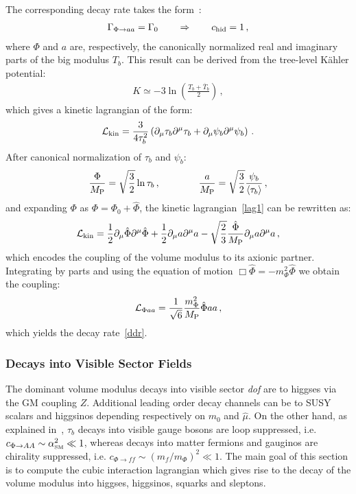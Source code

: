 \documentclass[12pt,a4paper]{book}
\def\SM{{\scriptscriptstyle \rm SM}}
\newcommand{\mc}{\mathcal}
\begin{document}
The corresponding decay rate takes the form~\cite{Cicoli:2012aq,Higaki:2012ar}: 
\begin{align}
\Gamma_{\Phi \rightarrow a a} = \Gamma_0\qquad\Rightarrow\qquad c_{\rm hid}=1\,,
\label{ddr}
\end{align}
where $\Phi$ and $a$ are, respectively, the canonically normalized real and imaginary parts of the big modulus $T_b$.
This result can be derived from the tree-level K\"ahler potential:
\begin{align}
K \simeq - 3 \ln\left(\frac{T_b+\overline{T}_b}{2}\right)\,,
\end{align}
which gives a kinetic lagrangian of the form:
\begin{align}
\mc{L}_{\rm kin} = \frac{3}{4 \tau_b^2} \left(\partial_\mu \tau_b \partial^\mu \tau_b + \partial_\mu \psi_b \partial^\mu \psi_b\right)\,.
\label{lag1}
\end{align}
After canonical normalization of $\tau_b$ and $\psi_b$:
\begin{align}
\label{cn1}
\frac{\Phi}{M_{\rm P}} = \sqrt{\frac{3}{2}} \ln \tau_b\,, \qquad \qquad \frac{a}{M_{\rm P}} = \sqrt{\frac{3}{2}} \frac{\psi_b}{\langle \tau_b \rangle}\,,
\end{align}
and expanding $\Phi$ as $\Phi = \Phi_0 + \hat \Phi$, the kinetic lagrangian~\eqref{lag1} can be rewritten as:
\begin{align}
\mc{L}_{\rm kin} = \frac 12 \partial_\mu \hat\Phi \partial^\mu \hat\Phi + \frac 12 \partial_\mu a \partial^\mu a - \sqrt{\frac 23 } \frac{\hat \Phi}{M_{\rm P}} \partial_\mu a \partial^\mu a\,,
\end{align}
which encodes the coupling of the volume modulus to its axionic partner. Integrating by parts and using the equation of motion 
$\Box \hat \Phi = - m_\Phi^2 \hat \Phi$ we obtain the coupling:
\begin{align}
\mathcal{L}_{\Phi a a} = \frac{1}{\sqrt{6}}\frac{m_\Phi^2}{M_{\rm P}} \hat\Phi a a\,,
\label{lphiaa}
\end{align}
which yields the decay rate~\eqref{ddr}.

\subsubsection{Decays into Visible Sector Fields}

The dominant volume modulus decays into visible sector \textit{dof} are to higgses via the GM coupling $Z$. Additional leading order decay channels can be to SUSY scalars and higgsinos depending respectively on $m_0$ and $\hat\mu$. On the other hand, as explained in~\cite{Cicoli:2012aq,Higaki:2012ar}, $\tau_b$ decays into visible gauge bosons are loop suppressed, i.e. $c_{\Phi\to A A}\sim \alpha_\SM^2 \ll 1$, whereas decays into matter fermions and gauginos are chirality suppressed, i.e. $c_{\Phi\to f f}\sim \left(m_f/m_\Phi\right)^2 \ll 1$. The main goal of this section is to compute the cubic interaction lagrangian which gives rise to the decay of the volume modulus into higgses, higgsinos, squarks and sleptons.
\end{document}
